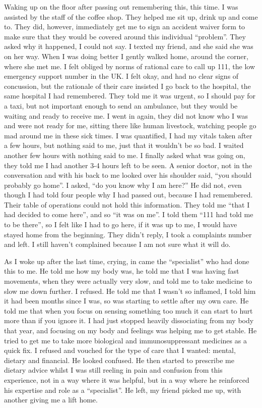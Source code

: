 Waking up on the floor after passing out remembering this, this time. I
was assisted by the staff of the coffee shop. They helped me sit up,
drink up and come to. They did, however, immediately get me to sign an
accident waiver form to make sure that they would be covered around this
individual ``problem''. They asked why it happened, I could not say. I
texted my friend, and she said she was on her way. When I was doing
better I gently walked home, around the corner, where she met me. I felt
obliged by norms of rational care to call up 111, the low emergency
support number in the UK. I felt okay, and had no clear signs of
concussion, but the rationale of their care insisted I go back to the
hospital, the same hospital I had remembered. They told me it was
urgent, so I should pay for a taxi, but not important enough to send an
ambulance, but they would be waiting and ready to receive me. I went in
again, they did not know who I was and were not ready for me, sitting
there like human livestock, watching people go mad around me in these
sick times. I was quantified, I had my vitals taken after a few hours,
but nothing said to me, just that it wouldn't be so bad. I waited
another few hours with nothing said to me. I finally asked what was
going on, they told me I had another 3-4 hours left to be seen. A senior
doctor, not in the conversation and with his back to me looked over his
shoulder said, ``you should probably go home''. I asked, ``do you know
why I am here?'' He did not, even though I had told four people why I
had passed out, because I had remembered. Their table of operations
could not hold this information. They told me ``that I had decided to
come here'', and so ``it was on me''. I told them ``111 had told me to
be there'', so I felt like I had to go here, if it was up to me, I would
have stayed home from the beginning. They didn't reply, I took a
complaints number and left. I still haven't complained because I am not
sure what it will do.

As I woke up after the last time, crying, in came the ``specialist'' who
had done this to me. He told me how my body was, he told me that I was
having fast movements, when they were actually very slow, and told me to
take medicine to slow me down further. I refused. He told me that I
wasn't so inflamed, I told him it had been months since I was, so was
starting to settle after my own care. He told me that when you focus on
sensing something too much it can start to hurt more than if you ignore
it. I had just stopped heavily dissociating from my body that year, and
focusing on my body and feelings was helping me to get stable. He tried
to get me to take more biological and immunosuppressant medicines as a
quick fix. I refused and vouched for the type of care that I wanted:
mental, dietary and financial. He looked confused. He then started to
prescribe me dietary advice whilst I was still reeling in pain and
confusion from this experience, not in a way where it was helpful, but
in a way where he reinforced his expertise and role as a ``specialist''.
He left, my friend picked me up, with another giving me a lift home.

